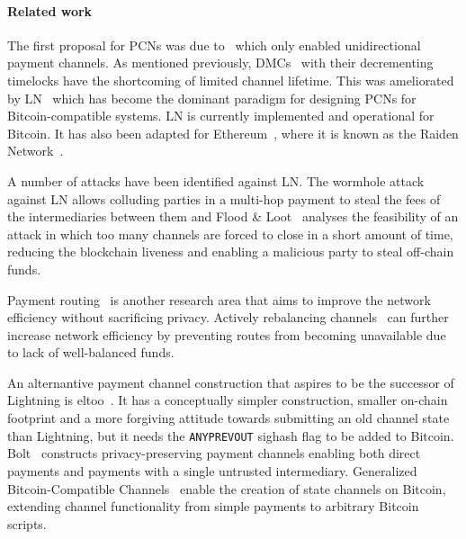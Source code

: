 \paragraph{Related work}
 The first proposal for PCNs was due to~\cite{spilman} which only enabled
 unidirectional payment channels. As mentioned previously, DMCs~\cite{decker}
 with their decrementing timelocks have the shortcoming of limited channel
 lifetime. This was ameliorated by LN~\cite{lightning} which has become the dominant paradigm for designing PCNs for Bitcoin-compatible systems. 
 LN is currently implemented and operational for
  Bitcoin. It has also been adapted for Ethereum~\cite{wood2014ethereum}, where
  it is known as the Raiden Network~\cite{raiden}.

A number of attacks have been identified against LN. The wormhole
  attack~\cite{DBLP:conf/ndss/MalavoltaMSKM19} against LN allows
  colluding parties in a multi-hop payment to steal the fees of the
  intermediaries between them and Flood \& Loot~\cite{10.1145/3419614.3423248}
  analyses the feasibility of an attack in which too many channels are forced to
  close in a short amount of time, reducing the blockchain liveness and enabling
  a malicious party to steal off-chain funds.

  Payment routing~\cite{spider,prihodko2016flare,lee2020routee} is another research area that aims to improve the network efficiency without sacrificing  privacy. Actively rebalancing channels~\cite{DBLP:conf/ccs/KhalilG17} can
  further increase network efficiency by preventing routes from becoming   unavailable due to lack of well-balanced funds.

  An alternantive payment channel construction that aspires to be the successor
  of Lightning is eltoo~\cite{eltoo}. It has a conceptually simpler
  construction, smaller on-chain footprint and a more forgiving attitude towards
  submitting an old channel state than Lightning, but it needs the
  \texttt{ANYPREVOUT} sighash flag to be added to Bitcoin.
  Bolt~\cite{10.1145/3133956.3134093} constructs privacy-preserving payment
  channels enabling both direct payments and payments with a single untrusted
  intermediary. Generalized Bitcoin-Compatible
  Channels~\cite{cryptoeprint:2020:476} enable the creation of state channels on
  Bitcoin, extending channel functionality from simple payments to arbitrary
  Bitcoin scripts.

